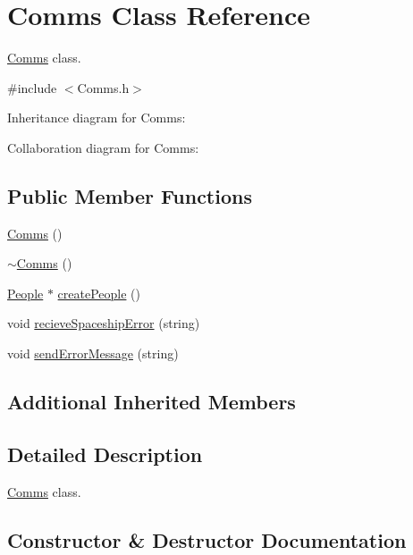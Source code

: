 \hypertarget{classComms}{}\section{Comms Class Reference}
\label{classComms}


\hyperlink{classComms}{Comms} class.  




{\ttfamily \#include $<$Comms.\+h$>$}



Inheritance diagram for Comms\+:


Collaboration diagram for Comms\+:
\subsection*{Public Member Functions}
\begin{DoxyCompactItemize}
\item 
\hyperlink{classComms_aa3878221ed907d6d6841ee77741c1f49}{Comms} ()
\item 
\hyperlink{classComms_ad18d3a80a82d18d27b0de3b551e4f5fc}{$\sim$\+Comms} ()
\item 
\hyperlink{classPeople}{People} $\ast$ \hyperlink{classComms_a137be676b73cbc1071145bf0afc37b0b}{create\+People} ()
\item 
void \hyperlink{classComms_a1aed1c01a813afd55309fdc59d2871bf}{recieve\+Spaceship\+Error} (string)
\item 
void \hyperlink{classComms_a23c37f6d10f06c7cfe25c4dc7d62fa12}{send\+Error\+Message} (string)
\end{DoxyCompactItemize}
\subsection*{Additional Inherited Members}


\subsection{Detailed Description}
\hyperlink{classComms}{Comms} class. 

\subsection{Constructor \& Destructor Documentation}
\mbox{\label{classComms_aa3878221ed907d6d6841ee77741c1f49}} 
